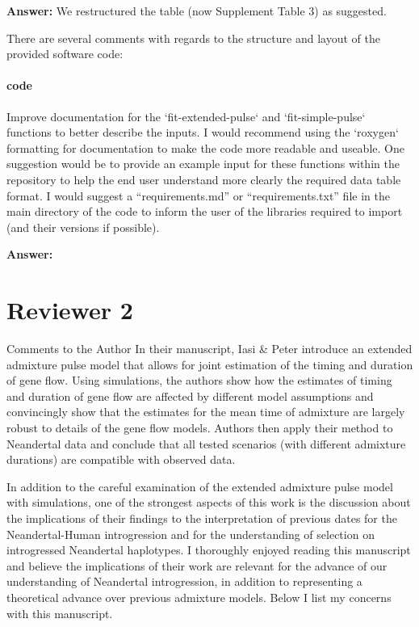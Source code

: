 \documentclass[11pt]{article}
\let\oldparagraph\paragraph
\renewcommand{\paragraph}[1]{\oldparagraph{#1}\mbox{}}
\begin{document}
\textbf{Answer:} We restructured the table (now Supplement Table 3) as suggested.

There are several comments with regards to the structure and layout of the provided software code:


\paragraph{code}
Improve documentation for the `fit-extended-pulse` and `fit-simple-pulse` functions to better describe the inputs. I would recommend using the `roxygen` formatting for documentation to make the code more readable and useable. 
One suggestion would be to provide an example input for these functions within the repository to help the end user understand more clearly the required data table format. 
I would suggest a “requirements.md” or “requirements.txt” file in the main directory of the code to inform the user of the libraries required to import (and their versions if possible).

\textbf{Answer:} 

\section{Reviewer 2}\label{Reviewer 2}
Comments to the Author
In their manuscript, Iasi & Peter introduce an extended admixture pulse model that allows for joint estimation of the timing and duration of gene flow. Using simulations, the authors show how the estimates of timing and duration of gene flow are affected by different model assumptions and convincingly show that the estimates for the mean time of admixture are largely robust to details of the gene flow models. Authors then apply their method to Neandertal data and conclude that all tested scenarios (with different admixture durations) are compatible with observed data.

In addition to the careful examination of the extended admixture pulse model with simulations, one of the strongest aspects of this work is the discussion about the implications of their findings to the interpretation of previous dates for the Neandertal-Human introgression and for the understanding of selection on introgressed Neandertal haplotypes. I thoroughly enjoyed reading this manuscript and believe the implications of their work are relevant for the advance of our understanding of Neandertal introgression, in addition to representing a theoretical advance over previous admixture models. Below I list my concerns with this manuscript. 
\end{document}
